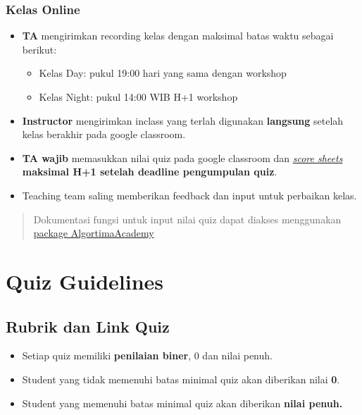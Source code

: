 \documentclass[
]{book}
\providecommand{\tightlist}{%
  \setlength{\itemsep}{0pt}\setlength{\parskip}{0pt}}
\begin{document}
\hypertarget{kelas-online-2}{%
\subsubsection{Kelas Online}\label{kelas-online-2}}

\begin{itemize}
\item
  \textbf{TA} mengirimkan recording kelas dengan maksimal batas waktu sebagai berikut:

  \begin{itemize}
  \tightlist
  \item
    Kelas Day: pukul 19:00 hari yang sama dengan workshop
  \item
    Kelas Night: pukul 14:00 WIB H+1 workshop
  \end{itemize}
\item
  \textbf{Instructor} mengirimkan inclass yang terlah digunakan \textbf{langsung} setelah kelas berakhir pada google classroom.
\item
  \textbf{TA wajib} memasukkan nilai quiz pada google classroom dan \href{https://docs.google.com/spreadsheets/d/1cGJ0pn9k9gKCBnceWVwaL9D7BBDMNjLh8uPYlaBlJi8/edit?usp=sharing}{\emph{score sheets}} \textbf{maksimal H+1 setelah deadline pengumpulan quiz}.
\item
  Teaching team saling memberikan feedback dan input untuk perbaikan kelas.
\end{itemize}

\begin{quote}
Dokumentasi fungsi untuk input nilai quiz dapat diakses menggunakan \href{https://github.com/Davidlimbong/AlgoritmaAcademy}{package AlgortimaAcademy}
\end{quote}

\hypertarget{quiz-guidelines}{%
\section{Quiz Guidelines}\label{quiz-guidelines}}

\hypertarget{rubrik-dan-link-quiz}{%
\subsection{Rubrik dan Link Quiz}\label{rubrik-dan-link-quiz}}

\begin{itemize}
\tightlist
\item
  Setiap quiz memiliki \textbf{penilaian biner}, 0 dan nilai penuh.
\item
  Student yang tidak memenuhi batas minimal quiz akan diberikan nilai \textbf{0}.
\item
  Student yang memenuhi batas minimal quiz akan diberikan \textbf{nilai penuh.}
\end{itemize}
\end{document}
